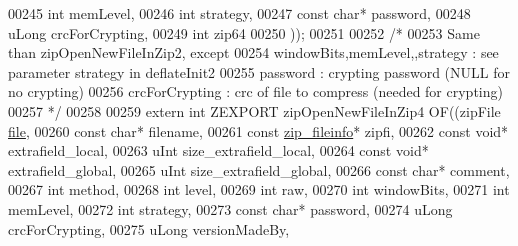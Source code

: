 \begin{DoxyCode}
00245                                             \textcolor{keywordtype}{int} memLevel,
00246                                             \textcolor{keywordtype}{int} strategy,
00247                                             \textcolor{keyword}{const} \textcolor{keywordtype}{char}* password,
00248                                             uLong crcForCrypting,
00249                                             \textcolor{keywordtype}{int} zip64
00250                                             ));
00251 
00252 \textcolor{comment}{/*}
00253 \textcolor{comment}{  Same than zipOpenNewFileInZip2, except}
00254 \textcolor{comment}{    windowBits,memLevel,,strategy : see parameter strategy in deflateInit2}
00255 \textcolor{comment}{    password : crypting password (NULL for no crypting)}
00256 \textcolor{comment}{    crcForCrypting : crc of file to compress (needed for crypting)}
00257 \textcolor{comment}{ */}
00258 
00259 \textcolor{keyword}{extern} \textcolor{keywordtype}{int} ZEXPORT zipOpenNewFileInZip4 OF((zipFile \hyperlink{structfile}{file},
00260                                             \textcolor{keyword}{const} \textcolor{keywordtype}{char}* filename,
00261                                             \textcolor{keyword}{const} \hyperlink{structzip__fileinfo}{zip\_fileinfo}* zipfi,
00262                                             \textcolor{keyword}{const} \textcolor{keywordtype}{void}* extrafield\_local,
00263                                             uInt size\_extrafield\_local,
00264                                             \textcolor{keyword}{const} \textcolor{keywordtype}{void}* extrafield\_global,
00265                                             uInt size\_extrafield\_global,
00266                                             \textcolor{keyword}{const} \textcolor{keywordtype}{char}* comment,
00267                                             \textcolor{keywordtype}{int} method,
00268                                             \textcolor{keywordtype}{int} level,
00269                                             \textcolor{keywordtype}{int} raw,
00270                                             \textcolor{keywordtype}{int} windowBits,
00271                                             \textcolor{keywordtype}{int} memLevel,
00272                                             \textcolor{keywordtype}{int} strategy,
00273                                             \textcolor{keyword}{const} \textcolor{keywordtype}{char}* password,
00274                                             uLong crcForCrypting,
00275                                             uLong versionMadeBy,

\end{DoxyCode}
